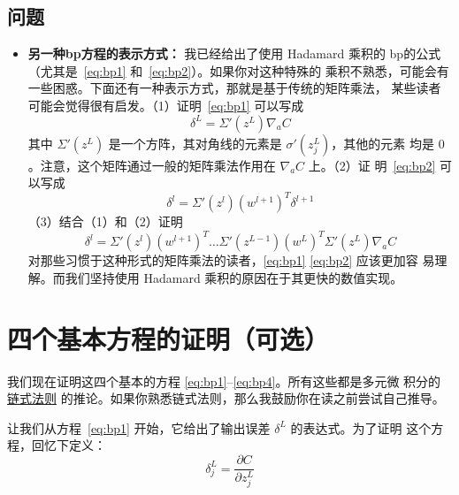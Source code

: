 \subsection*{问题}

\begin{itemize}
\item \textbf{另一种\gls*{bp}方程的表示方式：} 我已经给出了使用 Hadamard 乘积的
  \gls*{bp}的公式（尤其是~\eqref{eq:bp1} 和~\eqref{eq:bp2}）。如果你对这种特殊的
  乘积不熟悉，可能会有一些困惑。下面还有一种表示方式，那就是基于传统的矩阵乘法，
  某些读者可能会觉得很有启发。（1）证明~\eqref{eq:bp1} 可以写成
  \begin{equation}
    \delta^L = \Sigma'(z^L) \nabla_a C
    \label{eq:33}\tag{33}
  \end{equation}
  其中 $\Sigma'(z^L)$ 是一个方阵，其对角线的元素是 $\sigma'(z_j^L)$，其他的元素
  均是 $0$。注意，这个矩阵通过一般的矩阵乘法作用在 $\nabla_a C$ 上。（2）证
  明~\eqref{eq:bp2} 可以写成
  \begin{equation}
    \delta^l = \Sigma'(z^l) (w^{l+1})^T \delta^{l+1}
    \label{eq:34}\tag{34}
  \end{equation}
  （3）结合（1）和（2）证明
  \begin{equation}
    \delta^l = \Sigma'(z^l) (w^{l+1})^T \ldots \Sigma'(z^{L-1}) (w^L)^T
    \Sigma'(z^L) \nabla_a C
    \label{eq:35}\tag{35}
  \end{equation}
  对那些习惯于这种形式的矩阵乘法的读者，\eqref{eq:bp1} \eqref{eq:bp2} 应该更加容
  易理解。而我们坚持使用 Hadamard 乘积的原因在于其更快的数值实现。
\end{itemize}

\section{四个基本方程的证明（可选）}
\label{sec:proof_of_the_four_fundamental_equations}

我们现在证明这四个基本的方程 \eqref{eq:bp1}--\eqref{eq:bp4}。所有这些都是多元微
积分的\href{https://en.wikipedia.org/wiki/Chain_rule}{链式法则}%
的推论。如果你熟悉链式法则，那么我鼓励你在读之前尝试自己推导。

让我们从方程~\eqref{eq:bp1} 开始，它给出了输出误差 $\delta^L$ 的表达式。为了证明
这个方程，回忆下定义：
\begin{equation}
  \delta^L_j = \frac{\partial C}{\partial z^L_j}
\label{eq:36}\tag{36}
\end{equation}

